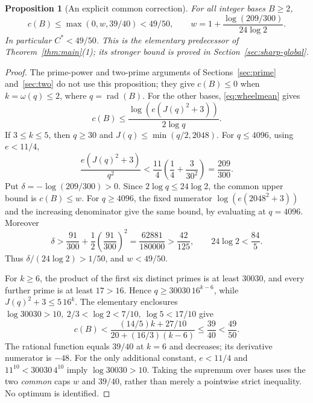 \documentclass[11pt]{article}
\newtheorem{proposition}[theorem]{Proposition}
\theoremstyle{definition}\newtheorem{definition}[theorem]{Definition}
\theoremstyle{remark}\newtheorem{remark}[theorem]{Remark}
\newcommand{\rad}{\operatorname{rad}}
\begin{document}
\begin{proposition}[An explicit common correction]\label{prop:uniform-correction}
For all integer bases \(B\ge2\),
\[
 c(B)\le\max(0,w,39/40)<49/50,\qquad
 w=1+\frac{\log(209/300)}{24\log2}.
\]
In particular \(C^*<49/50\). This is the elementary predecessor of
Theorem~\ref{thm:main}(1); its stronger bound is proved in
Section~\ref{sec:sharp-global}.
\end{proposition}
\begin{proof}
The prime-power and two-prime arguments of Sections~\ref{sec:prime}
and~\ref{sec:two} do not use this proposition; they give \(c(B)\le0\)
when \(k=\omega(q)\le2\), where \(q=\rad(B)\).
For the other bases, \eqref{eq:wheelmean} gives
\[
 c(B)\le\frac{\log(e(J(q)^2+3))}{2\log q}.
\]
If \(3\le k\le5\), then \(q\ge30\) and
\(J(q)\le\min(q/2,2048)\).
For \(q\le4096\), using \(e<11/4\),
\[
 \frac{e(J(q)^2+3)}{q^2}
 <\frac{11}{4}\left(\frac14+\frac3{30^2}\right)=\frac{209}{300}.
\]
Put \(\delta=-\log(209/300)>0\). Since
\(2\log q\le24\log2\), the common upper bound is \(c(B)\le w\).
For \(q\ge4096\), the fixed numerator \(\log(e(2048^2+3))\)
and the increasing denominator give the same bound, by evaluating
at \(q=4096\). Moreover
\[
 \delta>\frac{91}{300}+\frac12\left(\frac{91}{300}\right)^2
 =\frac{62881}{180000}>\frac{42}{125},\qquad
 24\log2<\frac{84}{5}.
\]
Thus \(\delta/(24\log2)>1/50\), and \(w<49/50\).

For \(k\ge6\), the product of the first six distinct primes is at least
\(30030\), and every further prime is at least \(17>16\).
Hence \(q\ge30030\,16^{k-6}\), while \(J(q)^2+3\le5\,16^k\).
The elementary enclosures
\(\log30030>10,\ 2/3<\log2<7/10,\ \log5<17/10\) give
\[
 c(B)<\frac{(14/5)k+27/10}{20+(16/3)(k-6)}
       \le\frac{39}{40}<\frac{49}{50}.
\]
The rational function equals \(39/40\) at \(k=6\) and decreases;
its derivative numerator is \(-48\).
For the only additional constant, \(e<11/4\) and
\(11^{10}<30030\,4^{10}\) imply \(\log30030>10\).
Taking the supremum over bases uses the two \emph{common} caps
\(w\) and \(39/40\), rather than merely a pointwise strict inequality.
No optimum is identified.
\end{proof}
\end{document}
